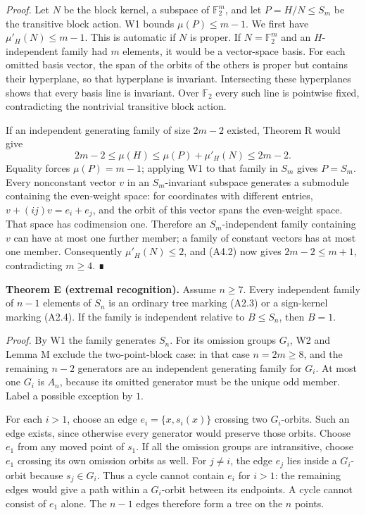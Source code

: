 \documentclass[
  10pt,
  letterpaper,
]{article}
\begin{document}
\emph{Proof.} Let \(N\) be the block kernel, a subspace of
\(\mathbb F_2^m\), and let \(P=H/N\leq S_m\) be the transitive block
action. W1 bounds \(\mu(P)\leq m-1\). We first have
\(\mu'_H(N)\leq m-1\). This is automatic if \(N\) is proper. If
\(N=\mathbb F_2^m\) and an \(H\)-independent family had \(m\) elements,
it would be a vector-space basis. For each omitted basis vector, the
span of the orbits of the others is proper but contains their
hyperplane, so that hyperplane is invariant. Intersecting these
hyperplanes shows that every basis line is invariant. Over
\(\mathbb F_2\) every such line is pointwise fixed, contradicting the
nontrivial transitive block action.

If an independent generating family of size \(2m-2\) existed, Theorem R
would give \[
2m-2\leq\mu(H)\leq\mu(P)+\mu'_H(N)\leq2m-2.
\] Equality forces \(\mu(P)=m-1\); applying W1 to that family in \(S_m\)
gives \(P=S_m\). Every nonconstant vector \(v\) in an \(S_m\)-invariant
subspace generates a submodule containing the even-weight space: for
coordinates with different entries, \(v+(ij)v=e_i+e_j\), and the orbit
of this vector spans the even-weight space. That space has codimension
one. Therefore an \(S_m\)-independent family containing \(v\) can have
at most one further member; a family of constant vectors has at most one
member. Consequently \(\mu'_H(N)\leq2\), and (A4.2) now gives
\(2m-2\leq m+1\), contradicting \(m\geq4\). ∎

\textbf{Theorem E (extremal recognition).} Assume \(n\geq7\). Every
independent family of \(n-1\) elements of \(S_n\) is an ordinary tree
marking (A2.3) or a sign-kernel marking (A2.4). If the family is
independent relative to \(B\leq S_n\), then \(B=1\).

\emph{Proof.} By W1 the family generates \(S_n\). For its omission
groups \(G_i\), W2 and Lemma M exclude the two-point-block case: in that
case \(n=2m\geq8\), and the remaining \(n-2\) generators are an
independent generating family for \(G_i\). At most one \(G_i\) is
\(A_n\), because its omitted generator must be the unique odd member.
Label a possible exception by \(1\).

For each \(i>1\), choose an edge \(e_i=\{x,s_i(x)\}\) crossing two
\(G_i\)-orbits. Such an edge exists, since otherwise every generator
would preserve those orbits. Choose \(e_1\) from any moved point of
\(s_1\). If all the omission groups are intransitive, choose \(e_1\)
crossing its own omission orbits as well. For \(j\ne i\), the edge
\(e_j\) lies inside a \(G_i\)-orbit because \(s_j\in G_i\). Thus a cycle
cannot contain \(e_i\) for \(i>1\): the remaining edges would give a
path within a \(G_i\)-orbit between its endpoints. A cycle cannot
consist of \(e_1\) alone. The \(n-1\) edges therefore form a tree on the
\(n\) points.
\end{document}
